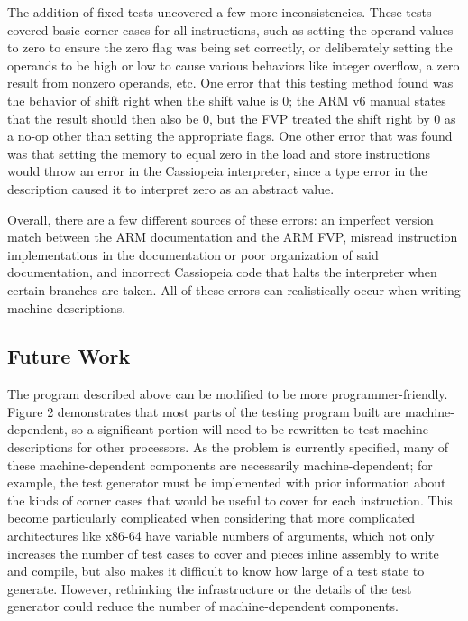 \documentclass[letterpaper,12pt]{article}
\begin{document}
The addition of fixed tests uncovered a few more inconsistencies. These tests covered basic corner cases for all instructions, such as setting the operand values to zero to ensure the zero flag was being set correctly, or deliberately setting the operands to be high or low to cause various behaviors like integer overflow, a zero result from nonzero operands, etc. One error that this testing method found was the behavior of shift right when the shift value is 0; the ARM v6 manual states that the result should then also be 0, but the FVP treated the shift right by 0 as a no-op other than setting the appropriate flags. One other error that was found was that setting the memory to equal zero in the load and store instructions would throw an error in the Cassiopeia interpreter, since a type error in the description caused it to interpret zero as an abstract value. 

Overall, there are a few different sources of these errors: an imperfect version match between the ARM documentation and the ARM FVP, misread instruction implementations in the documentation or poor organization of said documentation, and incorrect Cassiopeia code that halts the interpreter when certain branches are taken. All of these errors can realistically occur when writing machine descriptions.

\subsection{Future Work}

The program described above can be modified to be more programmer-friendly. Figure 2 demonstrates that most parts of the testing program built are machine-dependent, so a significant portion will need to be rewritten to test machine descriptions for other processors. As the problem is currently specified, many of these machine-dependent components are necessarily machine-dependent; for example, the test generator must be implemented with prior information about the kinds of corner cases that would be useful to cover for each instruction. This become particularly complicated when considering that more complicated architectures like x86-64 have variable numbers of arguments, which not only increases the number of test cases to cover and pieces inline assembly to write and compile, but also makes it difficult to know how large of a test state to generate. However, rethinking the infrastructure or the details of the test generator could reduce the number of machine-dependent components.
\end{document}

